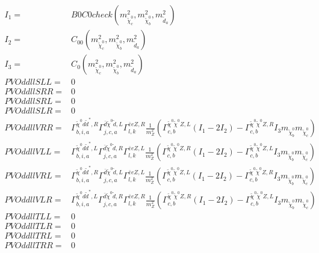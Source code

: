 \documentclass[A4,landscape]{article}
\begin{document}
\begin{align} 
I_1= & B0C0check(m^2_{\tilde{\chi}^0_{{c}}}, m^2_{\tilde{\chi}^0_{{b}}}, m^2_{\tilde{d}_{{a}}}) \\ 
I_2= & C_{00}(m^2_{\tilde{\chi}^0_{{c}}}, m^2_{\tilde{\chi}^0_{{b}}}, m^2_{\tilde{d}_{{a}}}) \\ 
I_3= & C_0(m^2_{\tilde{\chi}^0_{{c}}}, m^2_{\tilde{\chi}^0_{{b}}}, m^2_{\tilde{d}_{{a}}}) \\ 
  PVOddllSLL= & 0 \\ 
  PVOddllSRR= & 0 \\ 
  PVOddllSRL= & 0 \\ 
  PVOddllSLR= & 0 \\ 
  PVOddllVRR= &  \Gamma^{\tilde{\chi}^0 d \tilde{d}^*,R}_{b, i, a} \Gamma^{\bar{d}\tilde{\chi}^0 \tilde{d} ,L}_{j, c, a} \Gamma^{\bar{e}e Z ,R}_{l, k} \frac{1}{m^2_{Z}} (\Gamma^{\tilde{\chi}^0 \tilde{\chi}^0 Z ,L}_{c, b} (I_1 - 2 I_2) - \Gamma^{\tilde{\chi}^0 \tilde{\chi}^0 Z ,R}_{c, b} I_3 m_{\tilde{\chi}^0_{{b}}} m_{\tilde{\chi}^0_{{c}}}) \\ 
  PVOddllVLL= &  \Gamma^{\tilde{\chi}^0 d \tilde{d}^*,L}_{b, i, a} \Gamma^{\bar{d}\tilde{\chi}^0 \tilde{d} ,R}_{j, c, a} \Gamma^{\bar{e}e Z ,L}_{l, k} \frac{1}{m^2_{Z}} (\Gamma^{\tilde{\chi}^0 \tilde{\chi}^0 Z ,R}_{c, b} (I_1 - 2 I_2) - \Gamma^{\tilde{\chi}^0 \tilde{\chi}^0 Z ,L}_{c, b} I_3 m_{\tilde{\chi}^0_{{b}}} m_{\tilde{\chi}^0_{{c}}}) \\ 
  PVOddllVRL= &  \Gamma^{\tilde{\chi}^0 d \tilde{d}^*,R}_{b, i, a} \Gamma^{\bar{d}\tilde{\chi}^0 \tilde{d} ,L}_{j, c, a} \Gamma^{\bar{e}e Z ,L}_{l, k} \frac{1}{m^2_{Z}} (\Gamma^{\tilde{\chi}^0 \tilde{\chi}^0 Z ,L}_{c, b} (I_1 - 2 I_2) - \Gamma^{\tilde{\chi}^0 \tilde{\chi}^0 Z ,R}_{c, b} I_3 m_{\tilde{\chi}^0_{{b}}} m_{\tilde{\chi}^0_{{c}}}) \\ 
  PVOddllVLR= &  \Gamma^{\tilde{\chi}^0 d \tilde{d}^*,L}_{b, i, a} \Gamma^{\bar{d}\tilde{\chi}^0 \tilde{d} ,R}_{j, c, a} \Gamma^{\bar{e}e Z ,R}_{l, k} \frac{1}{m^2_{Z}} (\Gamma^{\tilde{\chi}^0 \tilde{\chi}^0 Z ,R}_{c, b} (I_1 - 2 I_2) - \Gamma^{\tilde{\chi}^0 \tilde{\chi}^0 Z ,L}_{c, b} I_3 m_{\tilde{\chi}^0_{{b}}} m_{\tilde{\chi}^0_{{c}}}) \\ 
  PVOddllTLL= & 0 \\ 
  PVOddllTLR= & 0 \\ 
  PVOddllTRL= & 0 \\ 
  PVOddllTRR= & 0 \\ 
\end{align} 
\end{document}
